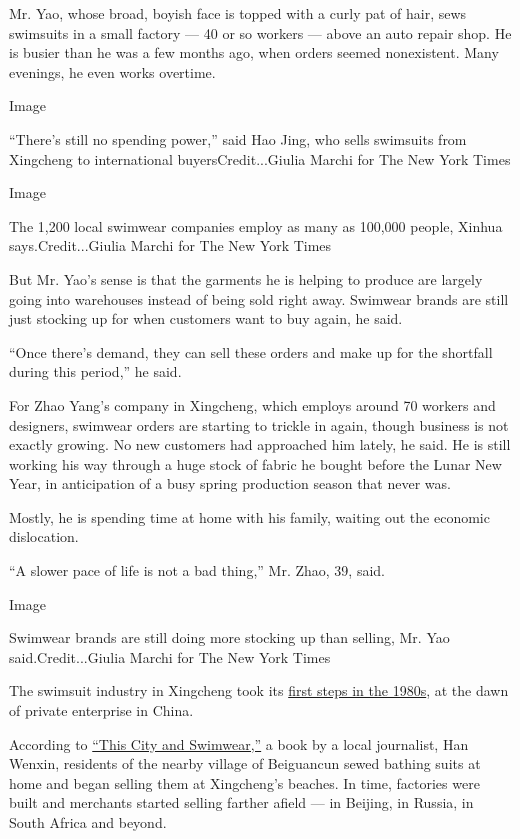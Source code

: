 Mr. Yao, whose broad, boyish face is topped with a curly pat of hair,
sews swimsuits in a small factory --- 40 or so workers --- above an auto
repair shop. He is busier than he was a few months ago, when orders
seemed nonexistent. Many evenings, he even works overtime.

Image

``There's still no spending power,'' said Hao Jing, who sells swimsuits
from Xingcheng to international buyersCredit...Giulia Marchi for The New
York Times

Image

The 1,200 local swimwear companies employ as many as 100,000 people,
Xinhua says.Credit...Giulia Marchi for The New York Times

But Mr. Yao's sense is that the garments he is helping to produce are
largely going into warehouses instead of being sold right away. Swimwear
brands are still just stocking up for when customers want to buy again,
he said.

``Once there's demand, they can sell these orders and make up for the
shortfall during this period,'' he said.

For Zhao Yang's company in Xingcheng, which employs around 70 workers
and designers, swimwear orders are starting to trickle in again, though
business is not exactly growing. No new customers had approached him
lately, he said. He is still working his way through a huge stock of
fabric he bought before the Lunar New Year, in anticipation of a busy
spring production season that never was.

Mostly, he is spending time at home with his family, waiting out the
economic dislocation.

``A slower pace of life is not a bad thing,'' Mr. Zhao, 39, said.

Image

Swimwear brands are still doing more stocking up than selling, Mr. Yao
said.Credit...Giulia Marchi for The New York Times

The swimsuit industry in Xingcheng took its
\href{https://www.jiemian.com/article/3126567.html}{first steps in the
1980s}, at the dawn of private enterprise in China.

According to
\href{https://www.weibo.com/p/1005055127456388?is_all=1}{``This City and
Swimwear,''} a book by a local journalist, Han Wenxin, residents of the
nearby village of Beiguancun sewed bathing suits at home and began
selling them at Xingcheng's beaches. In time, factories were built and
merchants started selling farther afield --- in Beijing, in Russia, in
South Africa and beyond.

